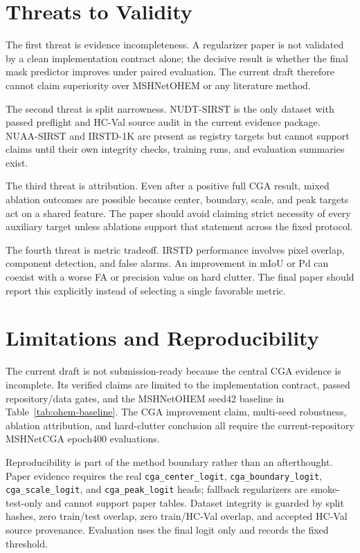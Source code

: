 \documentclass[letterpaper]{article}
\begin{document}
\section{Threats to Validity}

The first threat is evidence incompleteness. A regularizer paper is not validated by a clean implementation contract alone; the decisive result is whether the final mask predictor improves under paired evaluation. The current draft therefore cannot claim superiority over MSHNetOHEM or any literature method.

The second threat is split narrowness. NUDT-SIRST is the only dataset with passed preflight and HC-Val source audit in the current evidence package. NUAA-SIRST and IRSTD-1K are present as registry targets but cannot support claims until their own integrity checks, training runs, and evaluation summaries exist.

The third threat is attribution. Even after a positive full CGA result, mixed ablation outcomes are possible because center, boundary, scale, and peak targets act on a shared feature. The paper should avoid claiming strict necessity of every auxiliary target unless ablations support that statement across the fixed protocol.

The fourth threat is metric tradeoff. IRSTD performance involves pixel overlap, component detection, and false alarms. An improvement in mIoU or Pd can coexist with a worse FA or precision value on hard clutter. The final paper should report this explicitly instead of selecting a single favorable metric.

\section{Limitations and Reproducibility}

The current draft is not submission-ready because the central CGA evidence is incomplete. Its verified claims are limited to the implementation contract, passed repository/data gates, and the MSHNetOHEM seed42 baseline in Table~\ref{tab:ohem-baseline}. The CGA improvement claim, multi-seed robustness, ablation attribution, and hard-clutter conclusion all require the current-repository MSHNetCGA epoch400 evaluations.

Reproducibility is part of the method boundary rather than an afterthought. Paper evidence requires the real \texttt{cga\_center\_logit}, \texttt{cga\_boundary\_logit}, \texttt{cga\_scale\_logit}, and \texttt{cga\_peak\_logit} heads; fallback regularizers are smoke-test-only and cannot support paper tables. Dataset integrity is guarded by split hashes, zero train/test overlap, zero train/HC-Val overlap, and accepted HC-Val source provenance. Evaluation uses the final logit only and records the fixed threshold.
\end{document}
